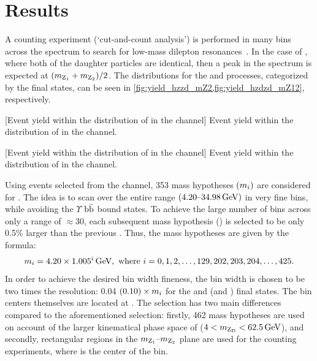 \section{Results}
\label{sec:results_dilep}
A counting experiment (`cut-and-count analysis') is performed in many bins across the \mZtwo spectrum to search for low-mass dilepton resonances~\cite{CMS:2021pcy}.
In the case of \htozdzd, where both of the daughter particles are identical, then a peak in the \mZtwo spectrum is expected at $(m_{\text{Z}_{\mathrm{1}}} + m_{\text{Z}_{\mathrm{2}}}) / 2$.
The \mZtwo distributions for the \htozzd and \htozdzd processes, categorized by the \mZtwo final states, can be seen in \cref{fig:yield_hzzd_mZ2,fig:yield_hzdzd_mZ12}, respectively.
\begin{multiFigure}
    \centering
        [Event yield within the distribution of \mZtwo in the \htozzd channel]
        {Event yield within the distribution of \mZtwo in the \htozzd channel.}
    \label{fig:yield_hzzd_mZ2}
\end{multiFigure}
\begin{multiFigure}
    \centering
        [Event yield within the distribution of \mZtwo in the \htozdzd channel]
        {Event yield within the distribution of \mZtwo in the \htozdzd channel.}
    \label{fig:yield_hzdzd_mZ12}
\end{multiFigure}

Using events selected from the \htozzd channel, 353 mass hypotheses $\left( m_{i} \right)$ are considered for \mZtwo.
The idea is to scan over the entire \mZtwo range $(4.20\text{--}34.98\,\text{Ge\hspace{-.08em}V})$ in very fine \mZtwo bins, while avoiding the $\varUpsilon$ $\mathrm{b} \bar{\mathrm{b}}$ bound states.  %
To achieve the large number of bins across only a range of $\approx$30\GeV, each subsequent mass hypothesis () is selected to be only 0.5\% larger than the previous .
Thus, the mass hypotheses are given by the formula:
\begin{align*}
    m_{i} = 4.20 \times 1.005^{i}\,\text{Ge\hspace{-.08em}V},
    \text{ where } i = 0,1,2, \ldots, 129, 202, 203, 204, \ldots, 425.
\end{align*}
In order to achieve the desired bin width fineness, the bin width is chosen to be two times the \mZtwo resolution:
0.04 $(0.10) \times m_{i}$ for the \fourmu and \twoetwomu (\foure and \twomutwoe) final states.
The bin centers themselves are located at .
The \zdzd selection has two main differences compared to the aforementioned \zzd selection:
firstly, 462 mass hypotheses are used on account of the larger kinematical phase space of \mZtwo ($4 < m_{\mathrm{Z}_\text{D}} < 62.5\,\text{Ge\hspace{-.08em}V}$),
and secondly, rectangular regions in the $m_{\text{Z}_{\mathrm{1}}} \text{--} m_{\text{Z}_{\mathrm{2}}}$ plane are used for the counting experiments, where  is the center of the bin.

